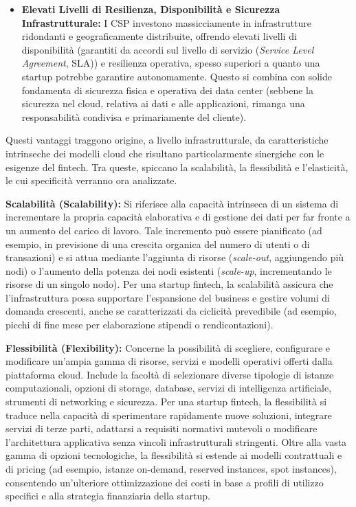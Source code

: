 \begin{itemize}
\item \textbf{Elevati Livelli di Resilienza, Disponibilità e Sicurezza Infrastrutturale:} I CSP investono massicciamente in infrastrutture ridondanti e geograficamente distribuite, offrendo elevati livelli di disponibilità (garantiti da accordi sul livello di servizio (\textit{Service Level Agreement}, SLA)) e resilienza operativa, spesso superiori a quanto una startup potrebbe garantire autonomamente. Questo si combina con solide fondamenta di sicurezza fisica e operativa dei data center (sebbene la sicurezza nel cloud, relativa ai dati e alle applicazioni, rimanga una responsabilità condivisa e primariamente del cliente).
\end{itemize}

Questi vantaggi traggono origine, a livello infrastrutturale, da caratteristiche intrinseche dei modelli cloud che risultano particolarmente sinergiche con le esigenze del fintech. Tra queste, spiccano la scalabilità, la flessibilità e l'elasticità, le cui specificità verranno ora analizzate.

\textbf{Scalabilità (Scalability):} Si riferisce alla capacità intrinseca di un sistema di incrementare la propria capacità elaborativa e di gestione dei dati per far fronte a un aumento del carico di lavoro. Tale incremento può essere pianificato (ad esempio, in previsione di una crescita organica del numero di utenti o di transazioni) e si attua mediante l'aggiunta di risorse (\textit{scale-out}, aggiungendo più nodi) o l'aumento della potenza dei nodi esistenti (\textit{scale-up}, incrementando le risorse di un singolo nodo). Per una startup fintech, la scalabilità assicura che l'infrastruttura possa supportare l'espansione del business e gestire volumi di domanda crescenti, anche se caratterizzati da ciclicità prevedibile (ad esempio, picchi di fine mese per elaborazione stipendi o rendicontazioni).

\textbf{Flessibilità (Flexibility):} Concerne la possibilità di scegliere, configurare e modificare un'ampia gamma di risorse, servizi e modelli operativi offerti dalla piattaforma cloud. Include la facoltà di selezionare diverse tipologie di istanze computazionali, opzioni di storage, database, servizi di intelligenza artificiale, strumenti di networking e sicurezza. Per una startup fintech, la flessibilità si traduce nella capacità di sperimentare rapidamente nuove soluzioni, integrare servizi di terze parti, adattarsi a requisiti normativi mutevoli o modificare l'architettura applicativa senza vincoli infrastrutturali stringenti. Oltre alla vasta gamma di opzioni tecnologiche, la flessibilità si estende ai modelli contrattuali e di pricing (ad esempio, istanze on-demand, reserved instances, spot instances), consentendo un'ulteriore ottimizzazione dei costi in base a profili di utilizzo specifici e alla strategia finanziaria della startup.

